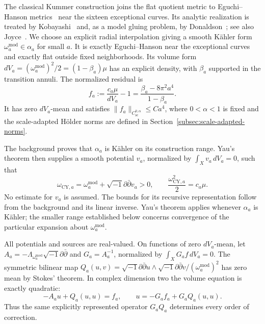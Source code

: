 \documentclass[11pt,a4paper,twoside]{article}
\numberwithin{equation}{section}
\newcommand{\ddc}{\sqrt{-1}\partial\bar\partial}
\theoremstyle{definition}
\theoremstyle{remark}
\begin{document}
The classical Kummer construction joins the flat quotient metric
to Eguchi--Hanson metrics~\cite{EguchiHanson} near the sixteen
exceptional curves. Its analytic realization is treated by
Kobayashi~\cite{Kobayashi1990} and, as a model gluing problem, by
Donaldson~\cite{DonaldsonKummer}; see also Joyce~\cite{Joyce2000}.
We choose an explicit radial interpolation giving a smooth K\"ahler
form \(\omega_a^{\mathrm{mod}}\in\alpha_a\) for small \(a\).
It is exactly Eguchi--Hanson near the exceptional curves and exactly
flat outside fixed neighborhoods. Its volume form
\(dV_a=(\omega_a^{\mathrm{mod}})^2/2=(1-\beta_a)\mu\) has
an explicit density, with \(\beta_a\) supported in the transition
annuli. The normalized residual is
\[
f_a:=\frac{c_a\mu}{dV_a}-1
=\frac{\beta_a-8\pi^2a^4}{1-\beta_a}.
\]
It has zero \(dV_a\)-mean and satisfies
\(\|f_a\|_{C_{\mathrm{sc}}^{0,\alpha}}\le Ca^4\), where
\(0<\alpha<1\) is fixed and the scale-adapted H\"older norms
are defined in Section~\ref{subsec:scale-adapted-norms}.

The background proves that \(\alpha_a\) is K\"ahler on its
construction range. Yau's theorem then supplies a smooth potential
\(v_a\), normalized by \(\int_Xv_a\,dV_a=0\), such that
\begin{equation}\label{eq:intro-Yau-target}
\omega_{\mathrm{CY},a}=\omega_a^{\mathrm{mod}}+\ddc v_a>0,
\qquad \frac{\omega_{\mathrm{CY},a}^2}{2}=c_a\mu.
\end{equation}
No estimate for \(v_a\) is assumed. The bounds for its recursive
representation follow from the background and its linear inverse.
Yau's theorem applies whenever \(\alpha_a\) is K\"ahler; the
smaller range established below concerns convergence of the
particular expansion about \(\omega_a^{\mathrm{mod}}\).

All potentials and sources are real-valued. On functions of zero
\(dV_a\)-mean, let \(A_a=-\Lambda_{\omega_a^{\mathrm{mod}}}\ddc\)
and \(G_a=A_a^{-1}\), normalized by \(\int_XG_af\,dV_a=0\).
The symmetric bilinear map
\(Q_a(u,v)=\ddc u\wedge\ddc v/(\omega_a^{\mathrm{mod}})^2\)
has zero mean by Stokes' theorem. In complex dimension two the
volume equation is exactly quadratic:
\[
-A_au+Q_a(u,u)=f_a,
\qquad u=-G_af_a+G_aQ_a(u,u).
\]
Thus the same explicitly represented operator \(G_aQ_a\)
determines every order of correction.
\end{document}
